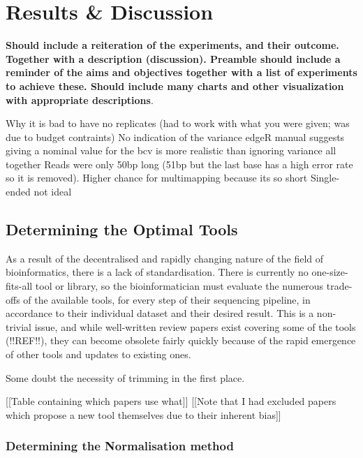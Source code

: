 \chapter{Results \& Discussion}

\textbf{Should include a reiteration of the experiments, and their outcome.  Together with a description (discussion).  Preamble should include a reminder of the aims and objectives together with a list of experiments to achieve these.  Should include many charts and other visualization with appropriate descriptions}.  


Why it is bad to have no replicates (had to work with what you were given; was due to budget contraints)
No indication of the variance
edgeR manual suggests giving a nominal value for the bcv is more realistic than ignoring variance all together
Reads were only 50bp long (51bp but the last base has a high error rate so it is removed). Higher chance for multimapping because its so short
Single-ended not ideal



\section{Determining the Optimal Tools}
As a result of the decentralised and rapidly changing nature of the field of bioinformatics, there is a lack of standardisation. There is currently no one-size-fits-all tool or library, so the bioinformatician must evaluate the numerous trade-offs of the available tools, for every step of their sequencing pipeline, in accordance to their individual dataset and their desired result. This is a non-trivial issue, and while well-written review papers exist covering some of the tools (!!REF!!), they can become obsolete fairly quickly because of the rapid emergence of other tools and updates to existing ones. 

Some \citep{liao2020read} doubt the necessity of trimming in the first place.


[[Table containing which papers use what]]
[[Note that I had excluded papers which propose a new tool themselves due to their inherent bias]]

\subsection{Determining the Normalisation method}

